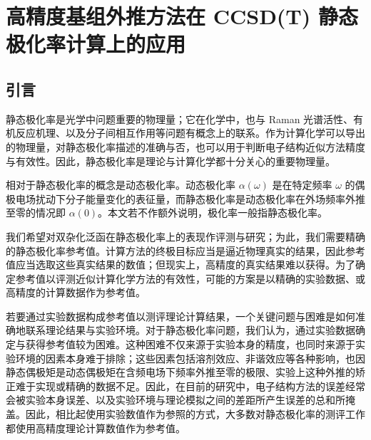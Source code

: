 
\chapter{高精度基组外推方法在 CCSD(T) 静态极化率计算上的应用}
\label{sec.5.title}

\section{引言}

静态极化率是光学中问题重要的物理量\cite{Marder-Stucky.ACS.1991}；它在化学中，也与 Raman 光谱活性\cite{Wilson-Cross.Dover.1955}、有机反应机理\cite{Xing-Pei.HEP.2005}、以及分子间相互作用\cite{Cohen-Tannoudji-Laloe.Wiley.2020}等问题有概念上的联系。作为计算化学可以导出的物理量，对静态极化率描述的准确与否，也可以用于判断电子结构近似方法精度与有效性。因此，静态极化率是理论与计算化学都十分关心的重要物理量。

相对于静态极化率的概念是动态极化率。动态极化率 $\alpha(\omega)$ 是在特定频率 $\omega$ 的偶极电场扰动下分子能量变化的表征量，而静态极化率是动态极化率在外场频率外推至零的情况即 $\alpha(0)$。本文若不作额外说明，极化率一般指静态极化率。

我们希望对双杂化泛函在静态极化率上的表现作评测与研究；为此，我们需要精确的静态极化率参考值。计算方法的终极目标应当是逼近物理真实的结果，因此参考值应当选取这些真实结果的数值；但现实上，高精度的真实结果难以获得。为了确定参考值以评测近似计算化学方法的有效性，可能的方案是以精确的实验数据、或高精度的计算数据作为参考值。

若要通过实验数据构成参考值以测评理论计算结果，一个关键问题与困难是如何准确地联系理论结果与实验环境\cite{Mata-Suhm.ACIE.2017}。对于静态极化率问题，我们认为，通过实验数据确定与获得参考值较为困难。这种困难不仅来源于实验本身的精度，也同时来源于实验环境的因素本身难于排除；这些因素包括溶剂效应、非谐效应等各种影响，也因静态偶极矩是动态偶极矩在含频电场下频率外推至零的极限、实验上这种外推的矫正难于实现或精确的数据不足。因此，在目前的研究中，电子结构方法的误差经常会被实验本身误差、以及实验环境与理论模拟之间的差距所产生误差的总和所掩盖\cite{Hickey-Rowley.JPCA.2014}。因此，相比起使用实验数值作为参照的方式\cite{Hickey-Rowley.JPCA.2014}，大多数对静态极化率的测评工作都使用高精度理论计算数值作为参考值\cite{Hammond-Xantheas.JCP.2009, Huzak-Deleuze.JCP.2013, Wu-Thakkar.CPL.2015, Kozlowska-Bartkowiak.PCCP.2019, Hait-Head-Gordon.PCCP.2018, Beizaei-Sauer.JPCA.2021}。

